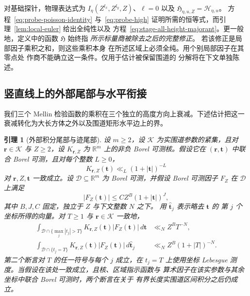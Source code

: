 \documentclass[11pt,a4paper]{article}
\numberwithin{equation}{section}
\numberwithin{figure}{section}
\newtheorem{lemma}[theorem]{引理}
\theoremstyle{definition}
\theoremstyle{remark}
\begin{document}
对基础探针，物理表达式为
$I_\eta(Z^{l_x},Z^{l_y},Z)$、$\ell=0$ 以及
$\mathfrak H_{\eta,u,Z}=\mathcal H_{\eta,u}$。
方程~\eqref{eq:probe-poisson-identity} 与~\eqref{eq:probe-high}
证明所需的恒等式，而引理~\ref{lem:local-euler} 给出全纯性以及
方程~\eqref{eq:stage-all-height-majorant}。更一般地，定义中的函数
$\mathfrak H$ 始终指
\emph{所示标量商被除去之后的完整修正}。
若该修正是局部因子乘积之和，则这些乘积本身
在所述区域上必须全纯。用个别局部因子在其零点处
作商不能确立这一条件。仅用于估计被保留围道的
分解将在下文单独陈述。

\subsection{竖直线上的外部尾部与水平衔接}

我们三个 Mellin 检验函数的乘积在三个独立的高度方向上衰减。下述估计把这一
衰减转化为大长方体之外以及围道矩形水平边上的界。

\begin{lemma}[外部积分尾部与迹尾部]
\label{lem:external-contour-tails}
设 $m\ge2$，设 $\mathcal K$ 为实围道参数的紧集，且对 $\boldsymbol r\in\mathcal K$ 与
$Z\ge2$，设 $K_{\boldsymbol r,Z}$ 为 $\mathbb R^m$ 上的非负 Borel 可测核。假设它在
$(\boldsymbol r,\boldsymbol t)$ 中联合 Borel 可测，且对每个整数 $L\ge0$，
\[
 K_{\boldsymbol r,Z}(\boldsymbol t)
 \ll_L(1+|\boldsymbol t|)^{-L}
\]
对 $\boldsymbol r,Z,\boldsymbol t$ 一致成立。设
$\mathcal D\subseteq\mathbb R^m$ 为 Borel 可测，并假设 Borel
可测因子 $F_Z$ 在 $\mathcal D$ 上满足
\begin{equation}
 |F_Z(\boldsymbol t)|\le C Z^B(1+|\boldsymbol t|)^J,
 \label{eq:external-arithmetic-majorant}
\end{equation}
其中 $B,J,C$ 固定，独立于 $Z$ 与下文整数 $N$ 之下。
用 $\widehat{\boldsymbol t}_j$ 表示略去 $\boldsymbol t$ 的
第 $j$ 个坐标所得的向量。对 $T\ge1$ 与
$\boldsymbol r\in\mathcal K$ 一致地，
\begin{align}
 \int_{\mathcal D\cap\{\max_j|t_j|>T\}}
 K_{\boldsymbol r,Z}(\boldsymbol t)|F_Z(\boldsymbol t)|\,d\boldsymbol t
 &\ll_N Z^B T^{-N},
 \label{eq:external-integrated-tail}\\
 \int_{\mathcal D\cap\{t_j=T\}}
 K_{\boldsymbol r,Z}(\boldsymbol t)|F_Z(\boldsymbol t)|\,
 d\widehat{\boldsymbol t}_j
 &\ll_N Z^B(1+|T|)^{-N}.
 \label{eq:external-trace-tail}
\end{align}
第二个断言对 $T$ 的任一符号与每个 $j$ 成立，在 $t_j=T$ 上使用坐标
Lebesgue 测度。当假设在该处一致成立，且核、区域指示函数与
算术因子在该实参数与其余坐标中联合 Borel 可测时，两个断言在关于
有界长度实围道区间积分之后仍成立。
\end{lemma}
\end{document}
